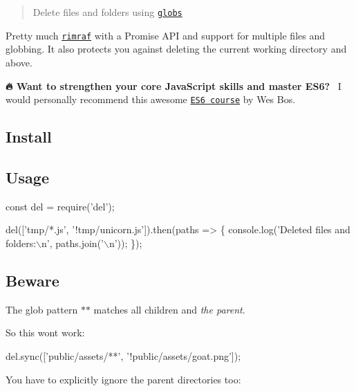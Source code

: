 \begin{quote}
Delete files and folders using \href{https://github.com/isaacs/minimatch#usage}{\tt globs} \end{quote}


Pretty much \href{https://github.com/isaacs/rimraf}{\tt rimraf} with a Promise A\+PI and support for multiple files and globbing. It also protects you against deleting the current working directory and above. 



{\bfseries 🔥 Want to strengthen your core Java\+Script skills and master E\+S6?}~\newline
I would personally recommend this awesome \href{https://ES6.io/friend/AWESOME}{\tt E\+S6 course} by Wes Bos.





\subsection*{Install}




\subsection*{Usage}


\begin{DoxyCode}
const del = require('del');

del(['tmp/*.js', '!tmp/unicorn.js']).then(paths => \{
    console.log('Deleted files and folders:\(\backslash\)n', paths.join('\(\backslash\)n'));
\});
\end{DoxyCode}


\subsection*{Beware}

The glob pattern {\ttfamily $\ast$$\ast$} matches all children and {\itshape the parent}.

So this won\textquotesingle{}t work\+:


\begin{DoxyCode}
del.sync(['public/assets/**', '!public/assets/goat.png']);
\end{DoxyCode}


You have to explicitly ignore the parent directories too\+:



